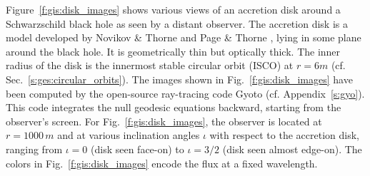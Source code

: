 Figure~\ref{f:gis:disk_images} shows various views of an accretion disk
around a Schwarzschild black hole as seen by a distant observer.
The accretion disk is a model
developed by Novikov \& Thorne \cite{NovikT73} and Page \& Thorne \cite{PageT74},
lying in some plane around the black hole.
It is geometrically thin but optically thick.
The inner radius of the disk
is the innermost stable circular orbit (ISCO)
at $r=6m$ (cf. Sec.~\ref{s:ges:circular_orbits}). The images shown in
Fig.~\ref{f:gis:disk_images} have been computed by the open-source ray-tracing code
\textsf{Gyoto} \cite{VincePGP11} (cf. Appendix~\ref{s:gyo}).
This code integrates the null geodesic equations backward, starting from the observer's
screen. For Fig.~\ref{f:gis:disk_images}, the observer is located at $r=1000\, m$
and at various inclination angles $\iota$ with respect to the accretion disk,
ranging from $\iota=0$ (disk seen face-on) to
$\iota=3/2$ (disk seen almost edge-on).
The colors in Fig.~\ref{f:gis:disk_images} encode the flux at a fixed wavelength.

